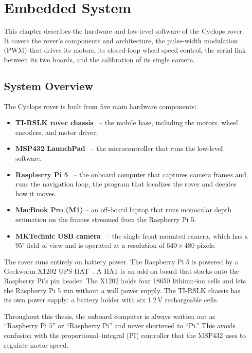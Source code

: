 \chapter{Embedded System}
\label{ch:embedded}

This chapter describes the hardware and low-level software of the Cyclops rover. It covers
the rover's components and architecture, the pulse-width modulation (PWM) that drives its
motors, its closed-loop wheel speed control, the serial link between its two boards, and
the calibration of its single camera.

\section{System Overview}
The Cyclops rover is built from five main hardware components:
\begin{itemize}
  \item \textbf{TI-RSLK rover chassis}~\cite{ti_rslk_max} -- the mobile base, including the motors,
    wheel encoders, and motor driver.
  \item \textbf{MSP432 LaunchPad}~\cite{msp432_p4} -- the microcontroller that runs the low-level
    software.
  \item \textbf{Raspberry Pi 5}~\cite{rpi5_brief} -- the onboard computer that captures camera frames
    and runs the navigation loop, the program that localizes the rover and decides how it
    moves.
  \item \textbf{MacBook Pro (M1)} -- an off-board laptop that runs monocular depth
    estimation on the frames streamed from the Raspberry Pi 5.
  \item \textbf{MKTechnic USB camera}~\cite{mktechnic_usb_camera} -- the single
    front-mounted camera, which has a $95^\circ$ field of view and is operated at
    a resolution of $640 \times 480$ pixels.
\end{itemize}

The rover runs entirely on battery power. The Raspberry Pi 5 is powered by a
Geekworm X1202 UPS HAT~\cite{geekworm_x1202}. A HAT
is an add-on board that stacks onto the Raspberry Pi's pin
header. The X1202 holds four 18650 lithium-ion cells and lets the Raspberry Pi 5 run
without a wall power supply. The TI-RSLK chassis has its own power supply: a battery
holder with six 1.2\,V rechargeable cells.

Throughout this thesis, the onboard computer is always written out as
``Raspberry Pi 5'' or ``Raspberry Pi'' and never shortened to ``Pi.'' This
avoids confusion with the proportional--integral (PI) controller that the MSP432
uses to regulate motor speed.

